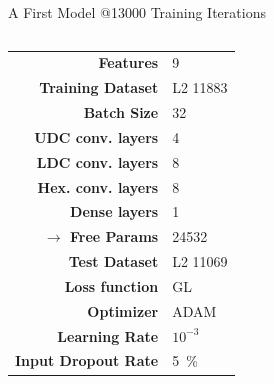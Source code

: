 \begin{frame}{A First Model @13000 Training Iterations}
    \begin{columns}
        \begin{column}{.35\textwidth}
            \begin{tabular}{>{\small\bf}r l}
                \toprule
                Features                  & 9                \\
                Training Dataset          & L2 11883         \\
                Batch Size                & 32               \\
                UDC conv. layers          & 4                \\
                LDC conv. layers          & 8                \\
                Hex. conv. layers         & 8                \\
                Dense layers              & 1\times50        \\
                $\rightarrow$ Free Params & 24532            \\
                \midrule
                Test Dataset              & L2 11069         \\
                Loss function             & GL               \\
                Optimizer                 & ADAM             \\
                Learning Rate             & $10^{-3}$        \\
                Input Dropout Rate        & \SI{5}{\percent} \\
                \bottomrule
            \end{tabular}
        \end{column}
        \begin{column}{.65\textwidth}
            \begin{figure}
                \centering
\end{figure}
\end{column}
\end{columns}
\end{frame}
